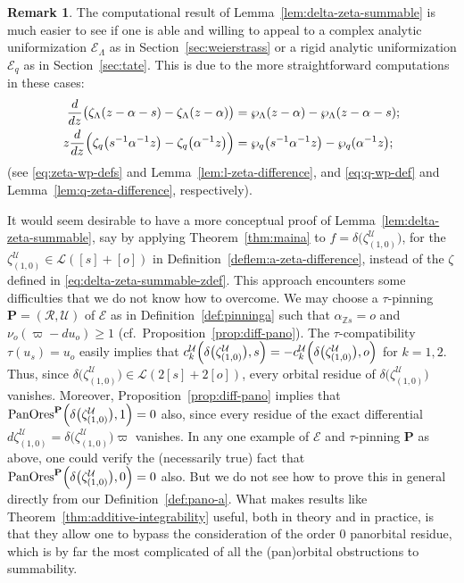 \documentclass[preprint,12pt]{elsarticle}
\numberwithin{equation}{section} %
\theoremstyle{theorem}
\theoremstyle{definition}
\newtheorem{remark}[theorem]{Remark}
\newcommand{\ec}{\mathcal{E}} %
\newcommand{\idec}{{o}} %
\newcommand{\ecl}{\ec_{\Lambda}} %
\newcommand{\ecq}{\ec_{q}}
\newcommand{\Z}{\mathbb{Z}} %
\newcommand{\wpl}{\wp_{\Lambda}}
\newcommand{\zl}{\zeta_{\Lambda}}
\newcommand{\zq}{\zeta_{q}}
\newcommand{\za}[2]{\zeta^{\mathcal{U}}_{( {#1} , {#2} )}}
\DeclareMathOperator{\pano}{PanOres}
\begin{document}
\begin{remark}\label{rem:delta-zeta-summable} The computational result of Lemma~\ref{lem:delta-zeta-summable} is much easier to see if one is able and willing to appeal to a complex analytic uniformization $\ecl$ as in Section~\ref{sec:weierstrass} or a rigid analytic uniformization $\ecq$ as in Section~\ref{sec:tate}. This is due to the more straightforward computations in these cases: \begin{align*}
\frac{d}{dz}\bigl(\zl(z-\alpha-s)-\zl(z-\alpha)\bigr) &=\wpl(z-\alpha)-\wpl(z-\alpha-s);\\
z\frac{d}{dz}\Bigl(\zq\bigl(s^{-1}\alpha^{-1}z\bigr)-\zq\bigl(\alpha^{-1}z\bigr)\Bigr)&=\wp_q\bigl(s^{-1}\alpha^{-1}z\bigr)-\wp_q(\alpha^{-1}z\bigr);\end{align*}
(see \eqref{eq:zeta-wp-defs} and Lemma~\ref{lem:l-zeta-difference}, and \eqref{eq:q-wp-def} and Lemma~\ref{lem:q-zeta-difference}, respectively).

It would seem desirable to have a more conceptual proof of Lemma~\ref{lem:delta-zeta-summable}, say by applying Theorem~\ref{thm:maina} to $f=\delta\bigl(\za{1}{0}\bigr)$, for the $\za{1}{0}\in\mathcal{L}([s]+[\idec])$ in Definition~\ref{deflem:a-zeta-difference}, instead of the $\zeta$ defined in \eqref{eq:delta-zeta-summable-zdef}. This approach encounters some difficulties that we do not know how to overcome. We may choose a $\tau$-pinning $\mathbf{P}=(\mathcal{R},\mathcal{U})$ of $\ec$ as in Definition~\ref{def:pinninga} such that $\alpha_{\Z s}=\idec$ and $\nu_\idec(\varpi-du_\idec)\geq 1$ (cf.~Proposition~\ref{prop:diff-pano}). The $\tau$-compatibility $\tau(u_s)=u_\idec$ easily implies that $c^\mathcal{U}_k\Bigl(\delta\bigl(\za{1}{0}\bigr),s\Bigr)=-c^\mathcal{U}_k\Bigl(\delta\bigl(\za{1}{0}\bigr),\idec\Bigr)$ for $k=1,2$. Thus, since $\delta\bigl(\za{1}{0}\bigr)\in\mathcal{L}(2[s]+2[\idec])$, every orbital residue of $\delta\bigl(\za{1}{0}\bigr)$ vanishes. Moreover, Proposition~\ref{prop:diff-pano} implies that $\pano^\mathbf{P}\Bigl(\delta\bigl(\za{1}{0}\bigr),1\Bigr)=0$ also, since every residue of the exact differential $d\za{1}{0}=\delta\bigl(\za{1}{0}\bigr)\varpi$ vanishes. In any one example of $\ec$ and $\tau$-pinning $\mathbf{P}$ as above, one could verify the (necessarily true) fact that $\pano^\mathbf{P}\Bigl(\delta\bigl(\za{1}{0}\bigr),0\Bigr)=0$ also. But we do not see how to prove this in general directly from our Definition~\ref{def:pano-a}. What makes results like Theorem~\ref{thm:additive-integrability} useful, both in theory and in practice, is that they allow one to bypass the consideration of the order $0$ panorbital residue, which is by far the most complicated of all the (pan)orbital obstructions to summability.\end{remark}
\end{document}
